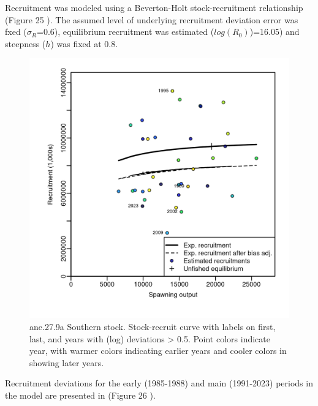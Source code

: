 \documentclass[
]{article}
\begin{document}
Recruitment was modeled using a Beverton-Holt stock-recruitment
relationship (Figure 25 ). The assumed level of underlying recruitment
deviation error was fxed (\(\sigma_R\)=0.6), equilibrium recruitment was
estimated (\(log(R_0)\))=16.05) and steepness (\(h\)) was fixed at 0.8.

\begin{figure}[H]

{\centering \includegraphics[width=0.95\linewidth]{report/run/S1.0_4FLEETS_SelECO_RecIndex_Mnewfix/fig_stock-recluta} 

}

\caption{ane.27.9a Southern stock. Stock-recruit curve with labels on first, last, and years with (log) deviations > 0.5. Point colors indicate year, with warmer colors indicating earlier years and cooler colors in showing later years.}\label{fig:unnamed-chunk-31}
\end{figure}

Recruitment deviations for the early (1985-1988) and main (1991-2023)
periods in the model are presented in (Figure 26 ).
\end{document}
